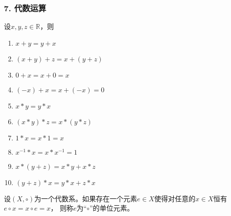 \documentclass{beamer}
\begin{document}
\begin{CJK*}{UTF8}{gbsn}
\begin{frame}
  \frametitle{7. 代数运算}
  \begin{minipage}[t]{0.49\linewidth}
  \begin{block}{}
    设$x, y, z \in \mathbb{R}$，则
   \begin{enumerate}
   \item   $x + y = y + x$
   \item   $(x + y) + z = x + (y + z)$
   \item   $0 + x = x + 0 = x$
   \item   $(-x) + x = x + (-x) = 0$
   \item   $x * y = y * x$
   \item   $(x * y) * z = x * (y *z)$
   \item   $1 * x = x * 1 = x$
   \item   $x^{-1} * x = x * x^{-1} = 1$
   \item   $x* (y + z) = x * y + x * z$
   \item   $(y + z) * x = y * x + z * x$
    \end{enumerate}
  \end{block}\pause
\end{minipage}
\begin{minipage}[t]{0.49\linewidth}
  \begin{Def}
    设$(X, \circ)$为一个代数系。如果存在一个元素$e\in X$使得对任意的$x\in X$恒有$e\circ x = x \circ e = x$， 则称$e$为“$\circ$”的\alert{单位元素}。
  \end{Def}
\end{minipage}
\end{frame}


\end{CJK*}
\end{document}
